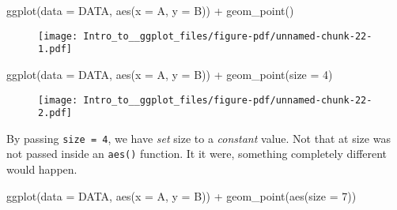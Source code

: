 \documentclass[
  letterpaper,
  DIV=11,
  numbers=noendperiod]{scrartcl}
\newenvironment{Shaded}{\begin{snugshade}}{\end{snugshade}}
\newcommand{\AttributeTok}[1]{\textcolor[rgb]{0.40,0.45,0.13}{#1}}
\newcommand{\DecValTok}[1]{\textcolor[rgb]{0.68,0.00,0.00}{#1}}
\newcommand{\FunctionTok}[1]{\textcolor[rgb]{0.28,0.35,0.67}{#1}}
\newcommand{\NormalTok}[1]{\textcolor[rgb]{0.00,0.23,0.31}{#1}}
\newcommand{\SpecialCharTok}[1]{\textcolor[rgb]{0.37,0.37,0.37}{#1}}
\begin{document}
\begin{Shaded}
\begin{Highlighting}[]
\FunctionTok{ggplot}\NormalTok{(}\AttributeTok{data =}\NormalTok{ DATA, }\FunctionTok{aes}\NormalTok{(}\AttributeTok{x =}\NormalTok{ A, }\AttributeTok{y =}\NormalTok{ B)) }\SpecialCharTok{+} 
  \FunctionTok{geom\_point}\NormalTok{()}
\end{Highlighting}
\end{Shaded}

\begin{figure}[H]

{\centering \texttt{[image: Intro\_to\_\_ggplot\_files/figure-pdf/unnamed-chunk-22-1.pdf]}

}

\end{figure}

\begin{Shaded}
\begin{Highlighting}[]
\FunctionTok{ggplot}\NormalTok{(}\AttributeTok{data =}\NormalTok{ DATA, }\FunctionTok{aes}\NormalTok{(}\AttributeTok{x =}\NormalTok{ A, }\AttributeTok{y =}\NormalTok{ B)) }\SpecialCharTok{+} 
  \FunctionTok{geom\_point}\NormalTok{(}\AttributeTok{size =} \DecValTok{4}\NormalTok{)}
\end{Highlighting}
\end{Shaded}

\begin{figure}[H]

{\centering \texttt{[image: Intro\_to\_\_ggplot\_files/figure-pdf/unnamed-chunk-22-2.pdf]}

}

\end{figure}

By passing \texttt{size\ =\ 4}, we have \emph{set} size to a
\emph{constant} value. Not that at size was not passed inside an
\texttt{aes()} function. It it were, something completely different
would happen.

\begin{Shaded}
\begin{Highlighting}[]
\FunctionTok{ggplot}\NormalTok{(}\AttributeTok{data =}\NormalTok{ DATA, }\FunctionTok{aes}\NormalTok{(}\AttributeTok{x =}\NormalTok{ A, }\AttributeTok{y =}\NormalTok{ B)) }\SpecialCharTok{+} 
  \FunctionTok{geom\_point}\NormalTok{(}\FunctionTok{aes}\NormalTok{(}\AttributeTok{size =} \DecValTok{7}\NormalTok{))}
\end{Highlighting}
\end{Shaded}
\end{document}
